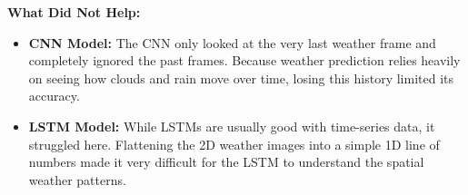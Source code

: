 \documentclass[12pt, a4paper]{article}
\begin{document}
                \noindent \textbf{What Did Not Help:}
                \begin{itemize}
                    \item \textbf{CNN Model:} The CNN only looked at the very last weather frame and completely ignored the past frames.
                    Because weather prediction relies heavily on seeing how clouds and rain move over time, losing this history limited its accuracy.
                    \item \textbf{LSTM Model:} While LSTMs are usually good with time-series data, it struggled here.
                    Flattening the 2D weather images into a simple 1D line of numbers made it very difficult for the LSTM to understand the spatial weather patterns.
                \end{itemize}
\end{document}
